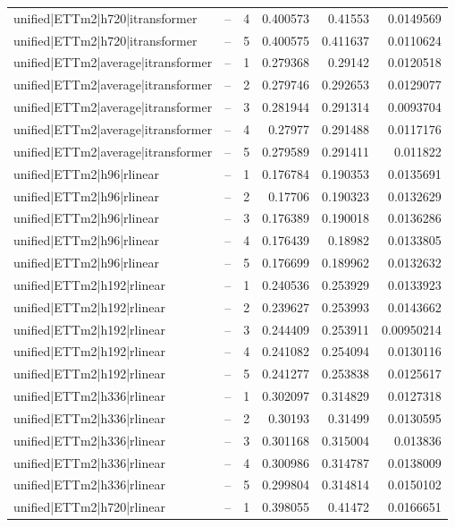 \begin{longtable}{llrrrr}
unified|ETTm2|h720|itransformer & -- & 4 & 0.400573 & 0.41553 & 0.0149569 \\
unified|ETTm2|h720|itransformer & -- & 5 & 0.400575 & 0.411637 & 0.0110624 \\
unified|ETTm2|average|itransformer & -- & 1 & 0.279368 & 0.29142 & 0.0120518 \\
unified|ETTm2|average|itransformer & -- & 2 & 0.279746 & 0.292653 & 0.0129077 \\
unified|ETTm2|average|itransformer & -- & 3 & 0.281944 & 0.291314 & 0.0093704 \\
unified|ETTm2|average|itransformer & -- & 4 & 0.27977 & 0.291488 & 0.0117176 \\
unified|ETTm2|average|itransformer & -- & 5 & 0.279589 & 0.291411 & 0.011822 \\
unified|ETTm2|h96|rlinear & -- & 1 & 0.176784 & 0.190353 & 0.0135691 \\
unified|ETTm2|h96|rlinear & -- & 2 & 0.17706 & 0.190323 & 0.0132629 \\
unified|ETTm2|h96|rlinear & -- & 3 & 0.176389 & 0.190018 & 0.0136286 \\
unified|ETTm2|h96|rlinear & -- & 4 & 0.176439 & 0.18982 & 0.0133805 \\
unified|ETTm2|h96|rlinear & -- & 5 & 0.176699 & 0.189962 & 0.0132632 \\
unified|ETTm2|h192|rlinear & -- & 1 & 0.240536 & 0.253929 & 0.0133923 \\
unified|ETTm2|h192|rlinear & -- & 2 & 0.239627 & 0.253993 & 0.0143662 \\
unified|ETTm2|h192|rlinear & -- & 3 & 0.244409 & 0.253911 & 0.00950214 \\
unified|ETTm2|h192|rlinear & -- & 4 & 0.241082 & 0.254094 & 0.0130116 \\
unified|ETTm2|h192|rlinear & -- & 5 & 0.241277 & 0.253838 & 0.0125617 \\
unified|ETTm2|h336|rlinear & -- & 1 & 0.302097 & 0.314829 & 0.0127318 \\
unified|ETTm2|h336|rlinear & -- & 2 & 0.30193 & 0.31499 & 0.0130595 \\
unified|ETTm2|h336|rlinear & -- & 3 & 0.301168 & 0.315004 & 0.013836 \\
unified|ETTm2|h336|rlinear & -- & 4 & 0.300986 & 0.314787 & 0.0138009 \\
unified|ETTm2|h336|rlinear & -- & 5 & 0.299804 & 0.314814 & 0.0150102 \\
unified|ETTm2|h720|rlinear & -- & 1 & 0.398055 & 0.41472 & 0.0166651 \\

\end{longtable}
